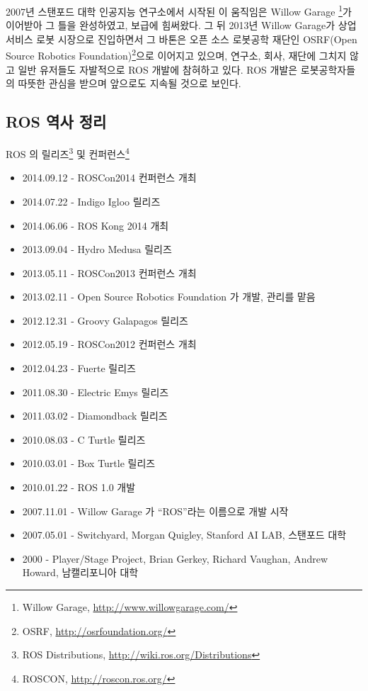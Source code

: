 2007년 스탠포드 대학 인공지능 연구소에서 시작된 이 움직임은 Willow Garage \footnote{Willow Garage, \url{http://www.willowgarage.com/}}가 이어받아 그 틀을 완성하였고, 보급에 힘써왔다. 그 뒤 2013년 Willow Garage가 상업 서비스 로봇 시장으로 진입하면서 그 바톤은 오픈 소스 로봇공학 재단인 OSRF(Open Source Robotics Foundation)\footnote{OSRF, \url{http://osrfoundation.org/}}으로 이어지고 있으며, 연구소, 회사, 재단에 그치지 않고 일반 유저들도 자발적으로 ROS 개발에 참혀하고 있다. ROS 개발은 로봇공학자들의 따뜻한 관심을 받으며 앞으로도 지속될 것으로 보인다.

\subsection{ROS 역사 정리}

ROS 의 릴리즈\footnote{ROS Distributions, \url{http://wiki.ros.org/Distributions}} 및 컨퍼런스\footnote{ROSCON, \url{http://roscon.ros.org/}}

\begin{itemize}
\item 2014.09.12 - ROSCon2014 컨퍼런스 개최
\item 2014.07.22 - Indigo Igloo 릴리즈
\item 2014.06.06 - ROS Kong 2014 개최
\item 2013.09.04 - Hydro Medusa 릴리즈
\item 2013.05.11 - ROSCon2013 컨퍼런스 개최
\item 2013.02.11 - Open Source Robotics Foundation 가 개발, 관리를 맡음
\item 2012.12.31 - Groovy Galapagos 릴리즈
\item 2012.05.19 - ROSCon2012 컨퍼런스 개최
\item 2012.04.23 - Fuerte 릴리즈
\item 2011.08.30 - Electric Emys 릴리즈
\item 2011.03.02 - Diamondback 릴리즈
\item 2010.08.03 - C Turtle 릴리즈
\item 2010.03.01 - Box Turtle 릴리즈
\item 2010.01.22 - ROS 1.0 개발
\item 2007.11.01 - Willow Garage 가 “ROS”라는 이름으로 개발 시작
\item 2007.05.01 - Switchyard, Morgan Quigley, Stanford AI LAB, 스탠포드 대학
\item 2000 - Player/Stage Project, Brian Gerkey, Richard Vaughan, Andrew Howard, 남캘리포니아 대학
\end{itemize}


